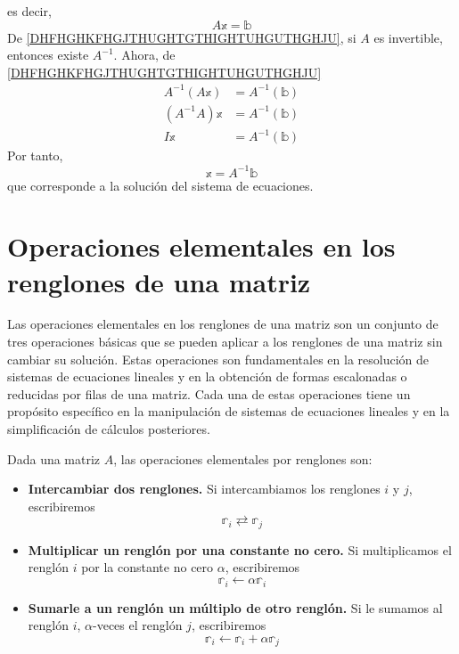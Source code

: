 es decir,
\begin{equation}
    A\mathbb{x} = \mathbb{b} \label{DHFHGHKFHGJTHUGHTGTHIGHTUHGUTHGHJU}
\end{equation}
De \eqref{DHFHGHKFHGJTHUGHTGTHIGHTUHGUTHGHJU}, si $A$ es invertible, entonces existe $A^{-1}$. Ahora, de \eqref{DHFHGHKFHGJTHUGHTGTHIGHTUHGUTHGHJU}
\begin{align*}
    A^{-1}(A\mathbb{x}) & = A^{-1}(\mathbb{b}) \\
    (A^{-1}A)\mathbb{x} & = A^{-1}(\mathbb{b}) \\
    I\mathbb{x} & = A^{-1}(\mathbb{b})
\end{align*}
Por tanto,
$$\mathbb{x} = A^{-1}\mathbb{b}$$
que corresponde a la solución del sistema de ecuaciones.

\section{Operaciones elementales en los renglones de una matriz}

Las operaciones elementales en los renglones de una matriz son un conjunto de tres operaciones básicas que se pueden aplicar a los renglones de una matriz sin cambiar su solución. Estas operaciones son fundamentales en la resolución de sistemas de ecuaciones lineales y en la obtención de formas escalonadas o reducidas por filas de una matriz. Cada una de estas operaciones tiene un propósito específico en la manipulación de sistemas de ecuaciones lineales y en la simplificación de cálculos posteriores.

\begin{tcolorbox}[
        theorem style=change break,
        enhanced,
        breakable,
        boxrule=0pt,
        frame hidden,
        colback=gray!20,
        coltitle=gray,
        attach title to upper={\ },
        sharp corners,
        fonttitle=\bfseries,
        fontupper=\normalsize,
    ]
    Dada una matriz $A$, las operaciones elementales por renglones son:
    \begin{itemize}
        \item \textbf{Intercambiar dos renglones.} Si intercambiamos los renglones $i$ y $j$, escribiremos
        \[ \mathbb{r}_i \rightleftarrows \mathbb{r}_j \]
        \item \textbf{Multiplicar un renglón por una constante no cero.} Si multiplicamos el renglón $i$ por la constante no cero $\alpha$, escribiremos
        \[ \mathbb{r}_i \leftarrow \alpha\mathbb{r}_i \]
        \item \textbf{Sumarle a un renglón un múltiplo de otro renglón.} Si le sumamos al renglón $i$, $\alpha$-veces el renglón $j$, escribiremos
        \[ \mathbb{r}_i \leftarrow \mathbb{r}_i + \alpha\mathbb{r}_j \]
    \end{itemize}
\end{tcolorbox}

